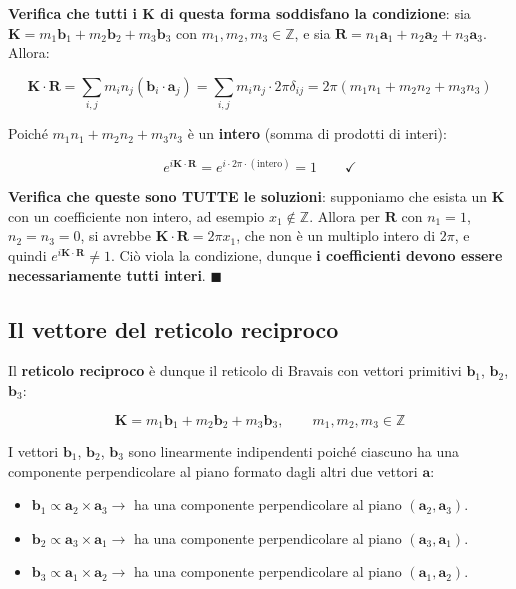 \textbf{Verifica che tutti i $\mathbf{K}$ di questa forma soddisfano la condizione}: sia $\mathbf{K} = m_1 \mathbf{b}_1 + m_2 \mathbf{b}_2 + m_3 \mathbf{b}_3$ con $m_1, m_2, m_3 \in \mathbb{Z}$, e sia $\mathbf{R} = n_1 \mathbf{a}_1 + n_2 \mathbf{a}_2 + n_3 \mathbf{a}_3$. Allora:

$$\mathbf{K} \cdot \mathbf{R} = \sum_{i,j} m_i n_j (\mathbf{b}_i \cdot \mathbf{a}_j) = \sum_{i,j} m_i n_j \cdot 2\pi \delta_{ij} = 2\pi(m_1 n_1 + m_2 n_2 + m_3 n_3)$$

Poiché $m_1 n_1 + m_2 n_2 + m_3 n_3$ è un \textbf{intero} (somma di prodotti di interi):

$$e^{i\mathbf{K} \cdot \mathbf{R}} = e^{i \cdot 2\pi \cdot (\text{intero})} = 1 \qquad \checkmark$$

\textbf{Verifica che queste sono TUTTE le soluzioni}: supponiamo che esista un $\mathbf{K}$ con un coefficiente non intero, ad esempio $x_1 \notin \mathbb{Z}$. Allora per $\mathbf{R}$ con $n_1 = 1$, $n_2 = n_3 = 0$, si avrebbe $\mathbf{K} \cdot \mathbf{R} = 2\pi x_1$, che non è un multiplo intero di $2\pi$, e quindi $e^{i\mathbf{K} \cdot \mathbf{R}} \neq 1$. Ciò viola la condizione, dunque \textbf{i coefficienti devono essere necessariamente tutti interi}. $\blacksquare$

\subsection{Il vettore del reticolo reciproco}

Il \textbf{reticolo reciproco} è dunque il reticolo di Bravais con vettori primitivi $\mathbf{b}_1$, $\mathbf{b}_2$, $\mathbf{b}_3$:

$$\mathbf{K} = m_1 \mathbf{b}_1 + m_2 \mathbf{b}_2 + m_3 \mathbf{b}_3, \qquad m_1, m_2, m_3 \in \mathbb{Z}$$

I vettori $\mathbf{b}_1$, $\mathbf{b}_2$, $\mathbf{b}_3$ sono linearmente indipendenti poiché ciascuno ha una componente perpendicolare al piano formato dagli altri due vettori $\mathbf{a}$:

\begin{itemize}
    \item $\mathbf{b}_1 \propto \mathbf{a}_2 \times \mathbf{a}_3 \to$ ha una componente perpendicolare al piano $(\mathbf{a}_2, \mathbf{a}_3)$.
    \item $\mathbf{b}_2 \propto \mathbf{a}_3 \times \mathbf{a}_1 \to$ ha una componente perpendicolare al piano $(\mathbf{a}_3, \mathbf{a}_1)$.
    \item $\mathbf{b}_3 \propto \mathbf{a}_1 \times \mathbf{a}_2 \to$ ha una componente perpendicolare al piano $(\mathbf{a}_1, \mathbf{a}_2)$.
\end{itemize}


